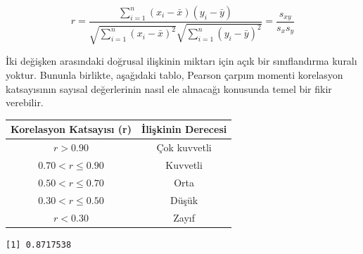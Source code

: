 \documentclass[
  letterpaper,
  DIV=11,
  numbers=noendperiod]{scrreprt}
\newenvironment{Shaded}{\begin{snugshade}}{\end{snugshade}}
\newcommand{\AttributeTok}[1]{\textcolor[rgb]{0.40,0.45,0.13}{#1}}
\newcommand{\CommentTok}[1]{\textcolor[rgb]{0.37,0.37,0.37}{#1}}
\newcommand{\FunctionTok}[1]{\textcolor[rgb]{0.28,0.35,0.67}{#1}}
\newcommand{\NormalTok}[1]{\textcolor[rgb]{0.00,0.23,0.31}{#1}}
\newcommand{\SpecialCharTok}[1]{\textcolor[rgb]{0.37,0.37,0.37}{#1}}
\newcommand{\StringTok}[1]{\textcolor[rgb]{0.13,0.47,0.30}{#1}}
\begin{document}
\[ r=\frac{\sum_{i=1}^n(x_i - \bar{x})(y_i - \bar{y})}{\sqrt{\sum_{i=1}^n(x_i-\bar{x})^2}\sqrt{\sum_{i=1}^n(y_i-\bar{y})^2}} = \frac{s_{xy}}{s_xs_y} \]

İki değişken arasındaki doğrusal ilişkinin miktarı için açık bir
sınıflandırma kuralı yoktur. Bununla birlikte, aşağıdaki tablo, Pearson
çarpım momenti korelasyon katsayısının sayısal değerlerinin nasıl ele
alınacağı konusunda temel bir fikir verebilir.

\begin{longtable}[]{@{}cc@{}}
\toprule\noalign{}
Korelasyon Katsayısı (r) & İlişkinin Derecesi \\
\midrule\noalign{}
\endhead
\bottomrule\noalign{}
\endlastfoot
\(r > 0.90\) & Çok kuvvetli \\
\(0.70 < r\le 0.90\) & Kuvvetli \\
\(0.50 < r\le 0.70\) & Orta \\
\(0.30 < r\le 0.50\) & Düşük \\
\(r < 0.30\) & Zayıf \\
\end{longtable}

\begin{Shaded}
\end{Shaded}

\begin{verbatim}
[1] 0.8717538
\end{verbatim}

\begin{Shaded}
\end{Shaded}
\end{document}
